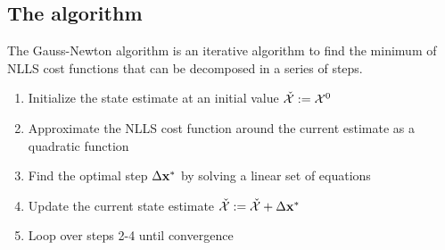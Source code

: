 \subsection{The algorithm}
The Gauss-Newton algorithm is an iterative algorithm to find the minimum of NLLS cost functions that can be decomposed in a series of steps.
\begin{enumerate}
    \item Initialize the state estimate at an initial value $\check{\mathcal{X}} := \mathcal{X}^0$
    \item Approximate the NLLS cost function around the current estimate as a quadratic function
    \item Find the optimal step $\Delta {\bf x}^*$ by solving a linear set of equations 
    \item Update the current state estimate $\check{\mathcal{X}} := \check{\mathcal{X}} + \Delta {\bf x}^*$
    \item Loop over steps 2-4 until convergence
\end{enumerate}








